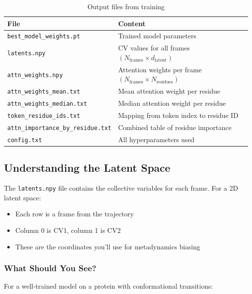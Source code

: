 \documentclass[12pt,a4paper]{article}
\begin{document}
\begin{table}[h]
\centering
\small
\begin{tabular}{@{}ll@{}}
\toprule
\textbf{File} & \textbf{Content} \\
\midrule
\texttt{best\_model\_weights.pt} & Trained model parameters \\
\texttt{latents.npy} & CV values for all frames $(N_{\text{frames}} \times d_{\text{latent}})$ \\
\texttt{attn\_weights.npy} & Attention weights per frame $(N_{\text{frames}} \times N_{\text{residues}})$ \\
\texttt{attn\_weights\_mean.txt} & Mean attention weight per residue \\
\texttt{attn\_weights\_median.txt} & Median attention weight per residue \\
\texttt{token\_residue\_ids.txt} & Mapping from token index to residue ID \\
\texttt{attn\_importance\_by\_residue.txt} & Combined table of residue importance \\
\texttt{config.txt} & All hyperparameters used \\
\bottomrule
\end{tabular}
\caption{Output files from training}
\end{table}

\subsection{Understanding the Latent Space}

The \texttt{latents.npy} file contains the collective variables for each frame. For a 2D latent space:
\begin{itemize}
    \item Each row is a frame from the trajectory
    \item Column 0 is CV1, column 1 is CV2
    \item These are the coordinates you'll use for metadynamics biasing
\end{itemize}

\subsubsection{What Should You See?}

For a well-trained model on a protein with conformational transitions:
\end{document}
